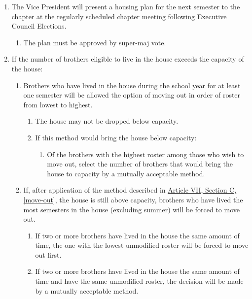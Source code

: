 	\begin{enumerate}
		\item The Vice President will present a housing plan for the next semester to the chapter at the regularly scheduled chapter meeting following Executive Council Elections.
			
			\begin{enumerate}
				\item The plan must be approved by \gls{super-maj} vote.
			\end{enumerate}

		\item If the number of brothers eligible to live in the house exceeds the capacity of the house:
			
			\begin{enumerate}
				\item Brothers who have lived in the house during the school year for at least one semester will be allowed the option of moving out in order of \gls{roster} from lowest to highest. \label{move-out}

					\begin{enumerate}
						\item The house may not be dropped below capacity.

						\item If this method would bring the house below capacity: 
							\begin{enumerate}
								\item Of the brothers with the highest \gls{roster} among those who wish to move out, select the number of brothers that would bring the house to capacity by a mutually acceptable method.
							\end{enumerate}
					\end{enumerate}

				\item If, after application of the method described in \hyperref[move-out]{Article VII, Section C, \autoref*{move-out}}, the house is still above capacity, brothers who have lived the most semesters in the house (excluding summer) will be forced to move out.
					
					\begin{enumerate}
						\item If two or more brothers have lived in the house the same amount of time, the one with the lowest unmodified \gls{roster} will be forced to move out first.

						\item If two or more brothers have lived in the house the same amount of time and have the same unmodified \gls{roster}, the decision will be made by a mutually acceptable method.


\end{enumerate}
\end{enumerate}
\end{enumerate}
